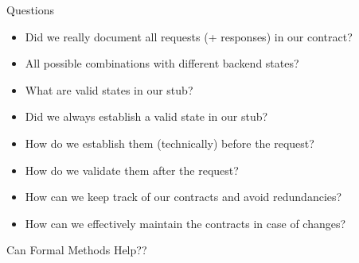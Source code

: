 \begin{frame}[fragile]{Questions}

\begin{itemize}[<+->]
\item Did we really document all requests (+ responses) in our contract?
\item All possible combinations with different backend states?

\vspace{1em}
\item What are valid states in our stub?
\item Did we always establish a valid state in our stub?
\item How do we establish them (technically) before the request?
\item How do we validate them after the request?

\vspace{1em}
\item How can we keep track of our contracts and avoid redundancies?
\item How can we effectively maintain the contracts in case of changes?
\end{itemize}


\end{frame}

\begin{frame}[fragile]{}

\begin{center}
{\Huge
Can Formal Methods Help??
}
\end{center}

\end{frame}

\begin{frame}[fragile]{}


\end{frame}

